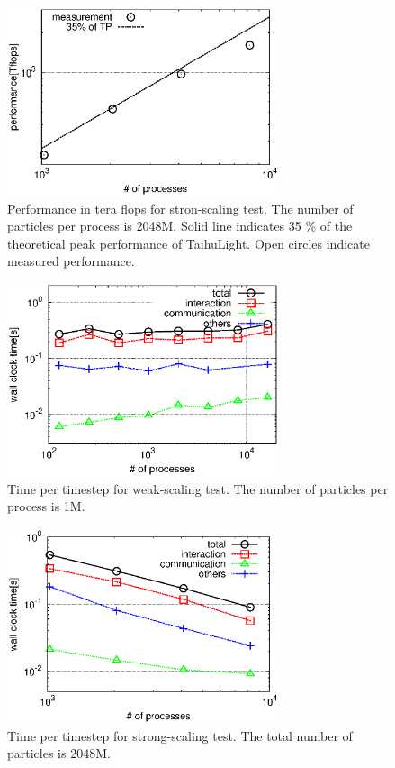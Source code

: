 \documentclass[oribibl]{llncs}
\begin{document}
\begin{figure}
  \begin{center}
    \includegraphics[width=8cm,clip]{./fig/strong_speed.eps}
  \end{center}
  \caption{Performance in tera flops for stron-scaling test. The
    number of particles per process is 2048M. Solid line indicates 35
    \% of the theoretical peak performance of TaihuLight. Open circles
    indicate measured performance.}
  \label{fig:strongpf}
\end{figure}

\begin{figure}
  \begin{center}
    \includegraphics[width=8cm,clip]{./fig/weak.eps}
  \end{center}
  \caption{Time per timestep for weak-scaling test. The number of
    particles per process is 1M.}
  \label{fig:weak}
\end{figure}

\begin{figure}
  \begin{center}
    \includegraphics[width=8cm,clip]{./fig/strong.eps}
  \end{center}
  \caption{Time per timestep for strong-scaling test. The total number of
    particles is 2048M.}
  \label{fig:strong}
\end{figure}
\end{document}
